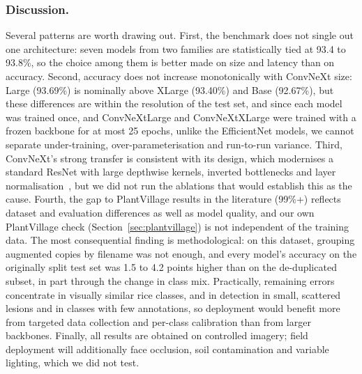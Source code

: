 \subsubsection{Discussion.}
Several patterns are worth drawing out. First, the benchmark does not single out one architecture: seven models from two families are statistically tied at 93.4 to 93.8\%, so the choice among them is better made on size and latency than on accuracy. Second, accuracy does not increase monotonically with ConvNeXt size: Large (93.69\%) is nominally above XLarge (93.40\%) and Base (92.67\%), but these differences are within the resolution of the test set, and since each model was trained once, and ConvNeXtLarge and ConvNeXtXLarge were trained with a frozen backbone for at most 25 epochs, unlike the EfficientNet models, we cannot separate under-training, over-parameterisation and run-to-run variance. Third, ConvNeXt's strong transfer is consistent with its design, which modernises a standard ResNet with large depthwise kernels, inverted bottlenecks and layer normalisation~\cite{convnext}, but we did not run the ablations that would establish this as the cause. Fourth, the gap to PlantVillage results in the literature (99\%+) reflects dataset and evaluation differences as well as model quality, and our own PlantVillage check (Section~\ref{sec:plantvillage}) is not independent of the training data. The most consequential finding is methodological: on this dataset, grouping augmented copies by filename was not enough, and every model's accuracy on the originally split test set was 1.5 to 4.2 points higher than on the de-duplicated subset, in part through the change in class mix. Practically, remaining errors concentrate in visually similar rice classes, and in detection in small, scattered lesions and in classes with few annotations, so deployment would benefit more from targeted data collection and per-class calibration than from larger backbones. Finally, all results are obtained on controlled imagery; field deployment will additionally face occlusion, soil contamination and variable lighting, which we did not test.

